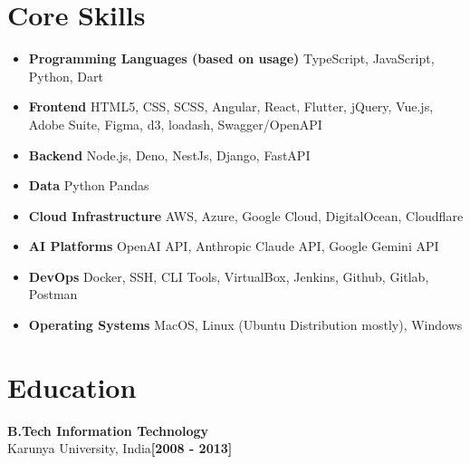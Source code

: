 \documentclass[letterpaper,10pt]{article}
\newcommand{\timelineEntry}[3]{%
	\noindent\color{accent}\large\textbf{#1}\\
	{\color{accent}#2}\hfill\textbf{\color{accent}\small[#3]}
	\newline\newline
}
\begin{document}
\section{Core Skills}
\begin{itemize}[leftmargin=*, itemsep=0.1em, label={}]
    \item \textbf{Programming Languages (based on usage)} TypeScript, JavaScript, Python, Dart
    \item \textbf{Frontend} HTML5, CSS, SCSS, Angular, React, Flutter, jQuery, Vue.js, Adobe Suite, Figma, d3, loadash, Swagger/OpenAPI
    \item \textbf{Backend} Node.js, Deno, NestJs, Django, FastAPI
    \item \textbf{Data} Python Pandas
    \item \textbf{Cloud Infrastructure} AWS, Azure, Google Cloud, DigitalOcean, Cloudflare
    \item \textbf{AI Platforms} OpenAI API, Anthropic Claude API, Google Gemini API
    \item \textbf{DevOps} Docker, SSH, CLI Tools, VirtualBox, Jenkins, Github, Gitlab, Postman
    \item \textbf{Operating Systems} MacOS, Linux (Ubuntu Distribution mostly), Windows
\end{itemize}

\section{Education}
\timelineEntry{B.Tech Information Technology}{Karunya University, India}{2008 - 2013}
\end{document}
